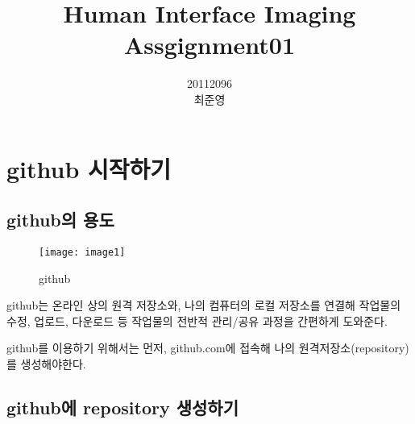 \documentclass[titlepage]{article}
\begin{document}
\begin{titlepage}

\title{Human Interface Imaging\\Assgignment01}
\author{20112096\\최준영}
\maketitle
\end{titlepage}

\tableofcontents
 
    
\newpage
\section{ github 시작하기}
	
		\subsection{ github의 용도}
   		\begin{figure}[h]
		\texttt{[image: image1]}
		\caption{github}
		\label{fig:figure1}
		\end{figure}

\par
\noindent github는 온라인 상의 원격 저장소와, 나의 컴퓨터의 로컬 저장소를 연결해 작업물의 수정, 업로드, 다운로드 등 작업물의 전반적 관리/공유 과정을 간편하게 도와준다.
\par
\noindent github를 이용하기 위해서는 먼저, github.com에 접속해 나의 원격저장소(repository)를 생성해야한다.\\

		\subsection{ github에 repository 생성하기}
			
\end{document}
